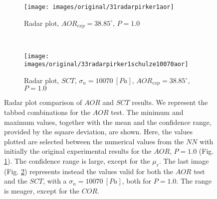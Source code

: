 \begin{figure}[htp] \centering
    \begin{subfigure}[b]{0.96\columnwidth}
        \texttt{[image: images/original/31radarpirker1aor]}
        \caption{Radar plot, $AOR_{exp} = 38.85 ^\circ$, $P=1.0$}
        \label{fig:31radarpirker1aor} 
    \end{subfigure}\\
        \begin{subfigure}[b]{0.96\columnwidth}
        \texttt{[image: images/original/33radarpirker1schulze10070aor]}
        \caption{Radar plot, $SCT$, $\sigma_n=10070 ~[Pa]$, $AOR_{exp} = 38.85
        ^\circ$, $P=1.0$}
        \label{fig:33radarpirker1schulze10070aor} 
    \end{subfigure}
    \caption[Radar plot comparison of AOR and SCT results]{Radar plot comparison
    of $AOR$ and $SCT$ results. We represent the tabbed combinations for the
    $AOR$ test.
    The minimum and maximum values, together with the mean and the confidence
	range, provided by the square deviation, are shown.
    Here, the values plotted are selected between the numerical
    values from the $NN$ with initially the original experimental results for
    the $AOR$, $P=1.0$ (Fig.
    \ref{fig:31radarpirker1aor}). 
    The confidence range is large, except for the $\mu_r$.
    The last image (Fig. \ref{fig:33radarpirker1schulze10070aor}) represents
    instead the values valid for both the $AOR$ test and the $SCT$, with a
    $\sigma_n=10070 ~[Pa]$, both for $P=1.0$.
    The range is meager, except for the $COR$.    }
    \label{fig:35schulze10070aorradarandcloud}
\end{figure}